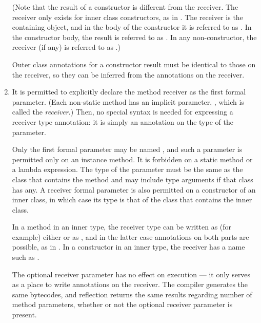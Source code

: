\documentclass[10pt]{article}
\begin{document}
\begin{enumerate}
(Note that the result of a constructor is different from the receiver.  The
receiver only exists for inner class constructors, as in
.  The receiver is the containing
object, and in the body of the constructor it is referred to as
.  In the constructor body, the result is referred to as
.  In any non-constructor, the receiver (if any) is referred to
as .)

Outer class annotations for a constructor result must be identical to
those on the receiver, so they can be inferred from the annotations on the
receiver.

\item
  \label{type-annotation-locations-receiver}%
  It is permitted to explicitly declare the method receiver as the first
  formal parameter.
  (Each non-static method has an implicit parameter, , which is
  called the \emph{receiver}.)
  Then, no special
  syntax is needed for expressing a receiver type annotation:  it is simply an
  annotation on the type of the  parameter.

  Only the first formal parameter may be
  named , and such a parameter is permitted only on an instance
  method.  It is forbidden on a static method or a lambda expression.  The type
  of the  parameter must be the same as the class that contains
  the method and may include type arguments if that class has any.
  A receiver  formal parameter is also permitted on a
  constructor of an inner class, in which case its type is that of the
  class that contains the inner class.




  In a method in an inner type,
  the receiver type can be
  written as (for example) either  or as ,
  and in the latter case annotations on both parts are possible, as in
  .
  In a constructor in an inner type, the receiver
  has a name such as .

  The optional receiver parameter has no effect on execution --- it only
  serves as a place to write annotations on the receiver.  The compiler
  generates the same bytecodes, and reflection returns the same results
  regarding number of method parameters, whether or not the optional
  receiver parameter is present.



\end{enumerate}
\end{document}
